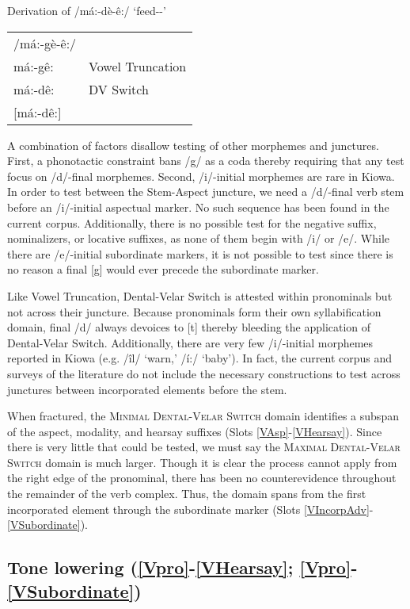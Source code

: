 \documentclass[output=paper]{langscibook}
\begin{document}
\ea Derivation of /má:-dè-ê:/ `feed-\Ipfv-\Hsy' \label{DV:AspHsy}
\begin{tabular}{ll} 
     /má:-gè-ê:/ &  \\
     má:-gê: & Vowel Truncation \\
     má:-dê: & DV Switch \\
     {[má:-dê:]} & \\
\end{tabular}
\z 

A combination of factors disallow testing of other morphemes and junctures. First, a phonotactic constraint bans /g/ as a coda thereby requiring that any test focus on /d/-final morphemes. Second, /i/-initial morphemes are rare in Kiowa. In order to test between the Stem-Aspect juncture, we need a /d/-final verb stem before an /i/-initial aspectual marker. No such sequence has been found in the current corpus. Additionally, there is no possible test for the negative suffix, nominalizers, or locative suffixes, as none of them begin with /i/ or /e/. While there are /e/-initial subordinate markers, it is not possible to test since there is no reason a final [g] would ever precede the subordinate marker. 

Like Vowel Truncation, Dental-Velar Switch is attested within pronominals but not across their juncture. Because pronominals form their own syllabification domain, final /d/ always devoices to [t] thereby bleeding the application of Dental-Velar Switch. Additionally, there are very few /i/-initial morphemes reported in Kiowa (e.g. /îl/ ‘warn,’ /í:/ ‘baby’). In fact, the current corpus and surveys of the literature do not include the necessary constructions to test across junctures between incorporated elements before the stem.

When fractured, the \textsc{Minimal Dental-Velar Switch} domain identifies a subspan of the aspect, modality, and hearsay suffixes (Slots \ref{VAsp}-\ref{VHearsay}). Since there is very little that could be tested, we must say the \textsc{Maximal Dental-Velar Switch} domain is much larger. Though it is clear the process cannot apply from the right edge of the pronominal, there has been no counterevidence throughout the remainder of the verb complex. Thus, the domain spans from the first incorporated element through the subordinate marker (Slots \ref{VIncorpAdv}-\ref{VSubordinate}).

\subsection{Tone lowering (\ref{Vpro}-\ref{VHearsay}; \ref{Vpro}-\ref{VSubordinate})} \label{sec:lowering}
\end{document}
